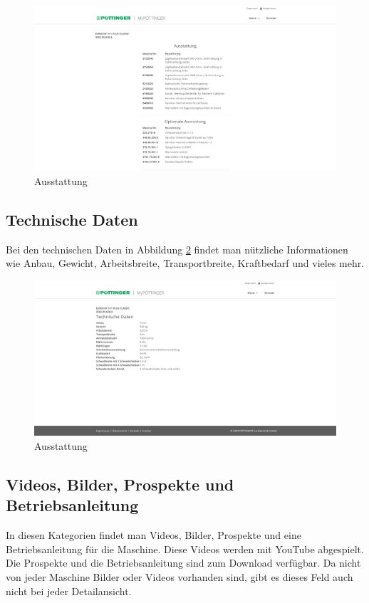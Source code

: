 \begin{figure}[H]
	\centerline{
		\includegraphics[width=1\textwidth, frame]{./grafiken/erm_detailansicht_ausstattung.PNG}
	}
	\vskip0pt
	\caption{Ausstattung} \label{fig:ausstattung}
\end{figure}
\newpage
\subsection{Technische Daten}

Bei den technischen Daten in Abbildung \ref{fig:technischeDaten} findet man nützliche Informationen wie Anbau, Gewicht, Arbeitsbreite, Transportbreite, Kraftbedarf und vieles mehr.

\begin{figure}[H]
	\centerline{
		\includegraphics[width=1\textwidth, frame]{./grafiken/erm_detailansicht_technisch.PNG}
	}
	\vskip0pt
	\caption{Ausstattung} \label{fig:technischeDaten}
\end{figure}
\subsection{Videos, Bilder, Prospekte und Betriebsanleitung}
In diesen Kategorien findet man Videos, Bilder, Prospekte und eine Betriebsanleitung für die Maschine. Diese Videos werden mit YouTube abgespielt. Die Prospekte und die Betriebsanleitung sind zum Download verfügbar. Da nicht von jeder Maschine Bilder oder Videos vorhanden sind, gibt es dieses Feld auch nicht bei jeder Detailansicht.
\newpage
